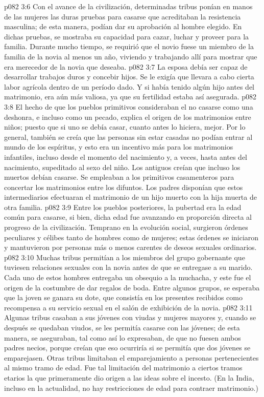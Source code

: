 \vs p082 3:6 Con el avance de la civilización, determinadas tribus ponían en manos de las mujeres las duras pruebas para casarse que acreditaban la resistencia masculina; de esta manera, podían dar su aprobación al hombre elegido. En dichas pruebas, se mostraba su capacidad para cazar, luchar y proveer para la familia. Durante mucho tiempo, se requirió que el novio fuese un miembro de la familia de la novia al menos un año, viviendo y trabajando allí para mostrar que era merecedor de la novia que deseaba.
\vs p082 3:7 La esposa debía ser capaz de desarrollar trabajos duros y concebir hijos. Se le exigía que llevara a cabo cierta labor agrícola dentro de un período dado. Y si había tenido algún hijo antes del matrimonio, era aún más valiosa, ya que su fertilidad estaba así asegurada.
\vs p082 3:8 \pc El hecho de que los pueblos primitivos consideraban el no casarse como una deshonra, e incluso como un pecado, explica el origen de los matrimonios entre niños; puesto que si uno se debía casar, cuanto antes lo hiciera, mejor. Por lo general, también se creía que las personas sin estar casadas no podían entrar al mundo de los espíritus, y esto era un incentivo más para los matrimonios infantiles, incluso desde el momento del nacimiento y, a veces, hasta antes del nacimiento, supeditado al sexo del niño. Los antiguos creían que incluso los muertos debían casarse. Se empleaban a los primitivos casamenteros para concertar los matrimonios entre los difuntos. Los padres disponían que estos intermediarios efectuaran el matrimonio de un hijo muerto con la hija muerta de otra familia.
\vs p082 3:9 Entre los pueblos posteriores, la pubertad era la edad común para casarse, si bien, dicha edad fue avanzando en proporción directa al progreso de la civilización. Temprano en la evolución social, surgieron órdenes peculiares y célibes tanto de hombres como de mujeres; estas órdenes se iniciaron y mantuvieron por personas más o menos carentes de deseos sexuales ordinarios.
\vs p082 3:10 Muchas tribus permitían a los miembros del grupo gobernante que tuviesen relaciones sexuales con la novia antes de que se entregase a su marido. Cada uno de estos hombres entregaba un obsequio a la muchacha, y este fue el origen de la costumbre de dar regalos de boda. Entre algunos grupos, se esperaba que la joven se ganara su dote, que consistía en los presentes recibidos como recompensa a su servicio sexual en el salón de exhibición de la novia.
\vs p082 3:11 Algunas tribus casaban a sus jóvenes con viudas y mujeres mayores y, cuando se después se quedaban viudos, se les permitía casarse con las jóvenes; de esta manera, se aseguraban, tal como así lo expresaban, de que no fuesen ambos padres necios, porque creían que eso ocurriría si se permitía que dos jóvenes se emparejasen. Otras tribus limitaban el emparejamiento a personas pertenecientes al mismo tramo de edad. Fue tal limitación del matrimonio a ciertos tramos etarios la que primeramente dio origen a las ideas sobre el incesto. (En la India, incluso en la actualidad, no hay restricciones de edad para contraer matrimonio.)
